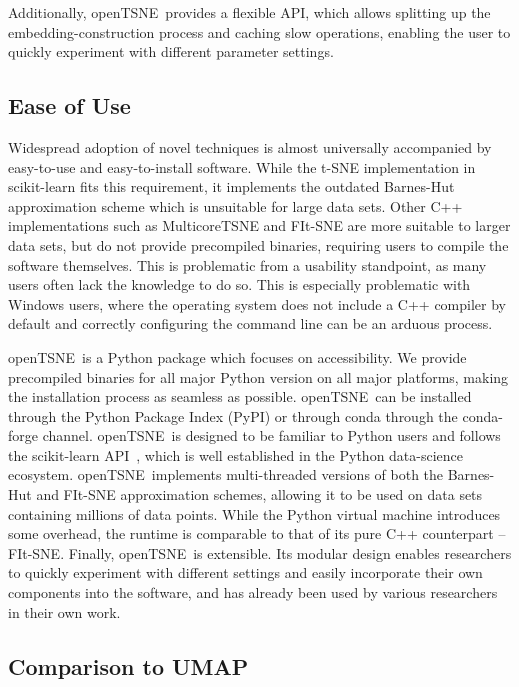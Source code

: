 \documentclass[twocolumn]{bmcart}
\newcommand{\opentsne}{\textsf{openTSNE}}
\begin{document}
Additionally, \opentsne\ provides a flexible API, which allows splitting up the embedding-construction process and caching slow operations, enabling the user to quickly experiment with different parameter settings.

\subsection*{Ease of Use}

Widespread adoption of novel techniques is almost universally accompanied by easy-to-use and easy-to-install software. While the t-SNE implementation in \textsf{scikit-learn} fits this requirement, it implements the outdated Barnes-Hut approximation scheme which is unsuitable for large data sets. Other C++ implementations such as \textsf{MulticoreTSNE} and \textsf{FIt-SNE} are more suitable to larger data sets, but do not provide precompiled binaries, requiring users to compile the software themselves. This is problematic from a usability standpoint, as many users often lack the knowledge to do so. This is especially problematic with Windows users, where the operating system does not include a C++ compiler by default and correctly configuring the command line can be an arduous process.

\opentsne\ is a Python package which focuses on accessibility. We provide precompiled binaries for all major Python version on all major platforms, making the installation process as seamless as possible. \opentsne\ can be installed through the Python Package Index (PyPI) or through conda through the conda-forge channel. \opentsne\ is designed to be familiar to Python users and follows the scikit-learn API~\cite{sklearn_api}, which is well established in the Python data-science ecosystem. \opentsne\ implements multi-threaded versions of both the Barnes-Hut and FIt-SNE approximation schemes, allowing it to be used on data sets containing millions of data points. While the Python virtual machine introduces some overhead, the runtime is comparable to that of its pure C++ counterpart -- \textsf{FIt-SNE}. Finally, \opentsne\ is extensible. Its modular design enables researchers to quickly experiment with different settings and easily incorporate their own components into the software, and has already been used by various researchers in their own work.

\subsection*{Comparison to UMAP}
\end{document}
